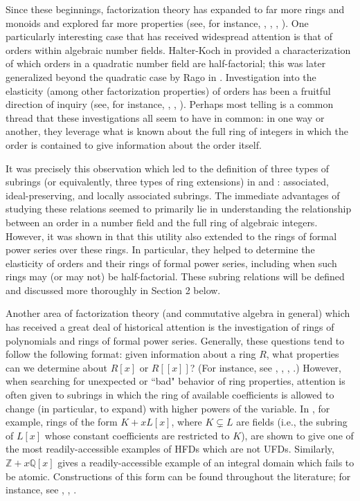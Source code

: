 \documentclass[12pt]{amsart}
\theoremstyle{definition}
\newcommand{\bZ}{\mathbb Z}
\newcommand{\bQ}{\mathbb Q}
\begin{document}
Since these beginnings, factorization theory has expanded to far more rings and monoids and explored far more properties (see, for instance, \cite{andersonandersonzafrullah}, \cite{ChapmanFactorizationTheory}, \cite{GeroldingerFactorizationSurvey}, \cite{coykendallpruferdomains}). One particularly interesting case that has received widespread attention is that of orders within algebraic number fields. Halter-Koch in \cite{halter-koch} provided a characterization of which orders in a quadratic number field are half-factorial; this was later generalized beyond the quadratic case by Rago in \cite{rago}. Investigation into the elasticity (among other factorization properties) of orders has been a fruitful direction of inquiry (see, for instance, \cite{choi2024class}, \cite{KettingerMoles2025elasticity}, \cite{SRelativeDavenport}). Perhaps most telling is a common thread that these investigations all seem to have in common: in one way or another, they leverage what is known about the full ring of integers in which the order is contained to give information about the order itself.

It was precisely this observation which led to the definition of three types of subrings (or equivalently, three types of ring extensions) in \cite{dissertation} and \cite{subringrelations}: associated, ideal-preserving, and locally associated subrings. The immediate advantages of studying these relations seemed to primarily lie in understanding the relationship between an order in a number field and the full ring of algebraic integers. However, it was shown in \cite{radicalconductor} that this utility also extended to the rings of formal power series over these rings. In particular, they helped to determine the elasticity of orders and their rings of formal power series, including when such rings may (or may not) be half-factorial. These subring relations will be defined and discussed more thoroughly in Section 2 below.

Another area of factorization theory (and commutative algebra in general) which has received a great deal of historical attention is the investigation of rings of polynomials and rings of formal power series. Generally, these questions tend to follow the following format: given information about a ring $R$, what properties can we determine about $R[x]$ or $R[[x]]$? (For instance, see \cite{gilerpolynomials}, \cite{coykendallextensions}, \cite{coykendallpolynomial}, \cite{radicalconductor}.) However, when searching for unexpected or ``bad" behavior of ring properties, attention is often given to subrings in which the ring of available coefficients is allowed to change (in particular, to expand) with higher powers of the variable. In \cite{anderson}, for example, rings of the form $K+xL[x]$, where $K\subsetneq L$ are fields (i.e., the subring of $L[x]$ whose constant coefficients are restricted to $K$), are shown to give one of the most readily-accessible examples of HFDs which are not UFDs. Similarly, $\bZ+x\bQ[x]$ gives a readily-accessible example of an integral domain which fails to be atomic. Constructions of this form can be found throughout the literature; for instance, see \cite{coykendallA+XBX}, \cite{changA+XBX}, \cite{gottiascentofquasi}.
\end{document}
